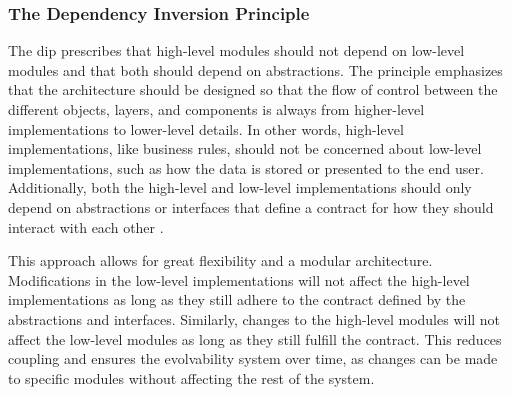 \subsubsection{The Dependency Inversion Principle} \label{subsubsec_dip} 

The \gls{dip} prescribes that high-level modules should not depend on low-level modules
and that both should depend on abstractions. The principle emphasizes that the
architecture should be designed so that the flow of control between the different objects,
layers, and components is always from higher-level implementations to lower-level details.
In other words, high-level implementations, like business rules, should not be concerned
about low-level implementations, such as how the data is stored or presented to the end
user. Additionally, both the high-level and low-level implementations should only depend
on abstractions or interfaces that define a contract for how they should interact with
each other \parencite[109]{robert_c_martin_clean_2018}. 

This approach allows for great flexibility and a modular architecture. Modifications in
the low-level implementations will not affect the high-level implementations as long as
they still adhere to the contract defined by the abstractions and interfaces. Similarly,
changes to the high-level modules will not affect the low-level modules as long as they
still fulfill the contract. This reduces coupling and ensures the evolvability system over
time, as changes can be made to specific modules without affecting the rest of the system.